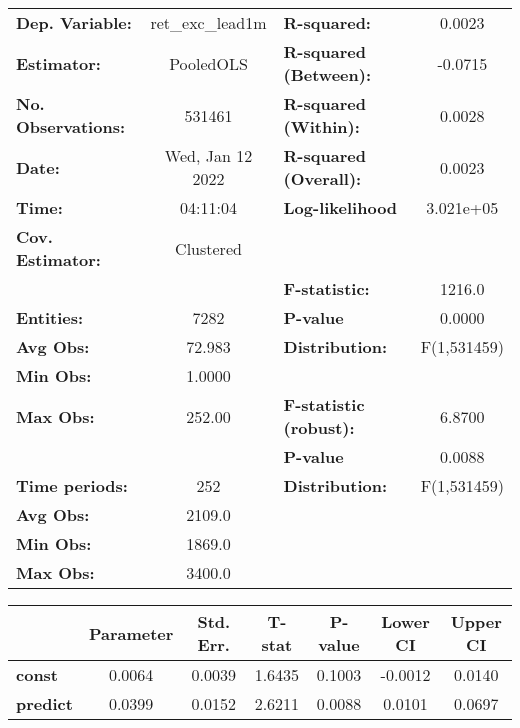\begin{center}
\begin{tabular}{lclc}
\toprule
\textbf{Dep. Variable:}    &  ret\_exc\_lead1m  & \textbf{  R-squared:         }   &      0.0023      \\
\textbf{Estimator:}        &     PooledOLS      & \textbf{  R-squared (Between):}  &     -0.0715      \\
\textbf{No. Observations:} &       531461       & \textbf{  R-squared (Within):}   &      0.0028      \\
\textbf{Date:}             &  Wed, Jan 12 2022  & \textbf{  R-squared (Overall):}  &      0.0023      \\
\textbf{Time:}             &      04:11:04      & \textbf{  Log-likelihood     }   &    3.021e+05     \\
\textbf{Cov. Estimator:}   &     Clustered      & \textbf{                     }   &                  \\
\textbf{}                  &                    & \textbf{  F-statistic:       }   &      1216.0      \\
\textbf{Entities:}         &        7282        & \textbf{  P-value            }   &      0.0000      \\
\textbf{Avg Obs:}          &       72.983       & \textbf{  Distribution:      }   &   F(1,531459)    \\
\textbf{Min Obs:}          &       1.0000       & \textbf{                     }   &                  \\
\textbf{Max Obs:}          &       252.00       & \textbf{  F-statistic (robust):} &      6.8700      \\
\textbf{}                  &                    & \textbf{  P-value            }   &      0.0088      \\
\textbf{Time periods:}     &        252         & \textbf{  Distribution:      }   &   F(1,531459)    \\
\textbf{Avg Obs:}          &       2109.0       & \textbf{                     }   &                  \\
\textbf{Min Obs:}          &       1869.0       & \textbf{                     }   &                  \\
\textbf{Max Obs:}          &       3400.0       & \textbf{                     }   &                  \\
\bottomrule
\end{tabular}
\begin{tabular}{lcccccc}
                 & \textbf{Parameter} & \textbf{Std. Err.} & \textbf{T-stat} & \textbf{P-value} & \textbf{Lower CI} & \textbf{Upper CI}  \\
\midrule
\textbf{const}   &       0.0064       &       0.0039       &      1.6435     &      0.1003      &      -0.0012      &       0.0140       \\
\textbf{predict} &       0.0399       &       0.0152       &      2.6211     &      0.0088      &       0.0101      &       0.0697       \\
\bottomrule
\end{tabular}
\end{center}
